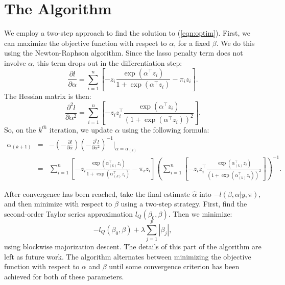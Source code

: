 \documentclass{article}\usepackage[]{graphicx}\usepackage[]{color}
\newcommand{\lc}{\left(}
\newcommand{\rc}{\right)}
\begin{document}
\section*{The Algorithm}
We employ a two-step approach to find the solution to (\ref{eqn:optim}).  First, we can maximize the objective function with respect to $\alpha$, for a fixed $\beta$.  We do this using the Newton-Raphson algorithm.  Since the lasso penalty term does not involve $\alpha$, this term drops out in the differentiation step:
\begin{equation} 
  \frac{\partial l}{\partial \alpha} = \sum_{i=1}^n \left[ -z_i \frac{\exp(\alpha^\top z_i)}{1+\exp(\alpha^\top z_i)} - \pi_i z_i \right].
\end{equation}
The Hessian matrix is then:
\begin{equation} 
  \frac{\partial^2 l}{\partial \alpha^2} = \sum_{i=1}^n \left[ -z_i z_i^\top \frac{\exp(\alpha^\top z_i)}{(1+\exp(\alpha^\top z_i))^2} \right].
\end{equation}
So, on the $k^{th}$ iteration, we update $\alpha$ using the following formula:
\begin{eqnarray} 
  \alpha_{(k+1)} &=& -\lc-\frac{\partial l}{\partial \alpha}\rc \lc-\frac{\partial^2 l}{\partial \alpha^2}\rc^{-1}\bigg|_{\alpha=\alpha_{(k)}} \\
  &=&  \sum_{i=1}^n \left[ -z_i \frac{\exp(\alpha_{(k)}^\top z_i)}{1+\exp(\alpha_{(k)}^\top z_i)} - \pi_i z_i \right] \lc \sum_{i=1}^n \left[ -z_i z_i^\top \frac{\exp(\alpha_{(k)}^\top z_i)}{(1+\exp(\alpha_{(k)}^\top z_i))^2} \right] \rc^{-1}.
\end{eqnarray}

After convergence has been reached, take the final estimate $\hat{\alpha}$ into $-l(\beta,\alpha | y, \pi)$, and then minimize with respect to $\beta$ using a two-step strategy.  First, find the second-order Taylor series approximation $l_Q(\beta_0,\beta)$.  Then we minimize:
\begin{equation} 
  -l_Q(\beta_0,\beta) + \lambda\sum_{j=1}^p |\beta_j|,
\end{equation}
using blockwise majorization descent.  The details of this part of the algorithm are left as future work.
The algorithm alternates between minimizing the objective function with respect to $\alpha$ and $\beta$ until some convergence criterion has been achieved for both of these parameters.
\end{document}
